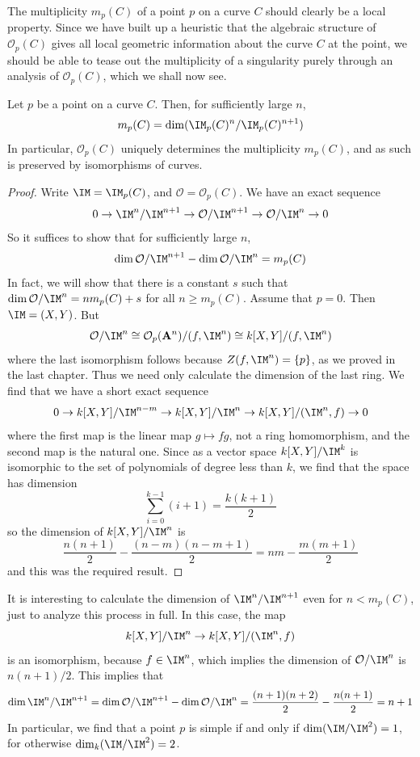 The multiplicity $m_p(C)$ of a point $p$ on a curve $C$ should clearly be a local property. Since we have built up a heuristic that the algebraic structure of $\mathcal{O}_p(C)$ gives all local geometric information about the curve $C$ at the point, we should be able to tease out the multiplicity of a singularity purely through an analysis of $\mathcal{O}_p(C)$, which we shall now see.

\begin{prop}
    Let $p$ be a point on a curve $C$. Then, for sufficiently large $n$,
    \[ m_p(C) = \dim(\IM_p(C)^n/\IM_p(C)^{n+1}) \]
    In particular, $\mathcal{O}_p(C)$ uniquely determines the multiplicity $m_p(C)$, and as such is preserved by isomorphisms of curves.
\end{prop}
\begin{proof}
    Write $\IM = \IM_p(C)$, and $\mathcal{O} = \mathcal{O}_p(C)$. We have an exact sequence
    \[ 0 \to \IM^n/\IM^{n+1} \to \mathcal{O}/\IM^{n+1} \to \mathcal{O}/\IM^n \to 0 \]
    So it suffices to show that for sufficiently large $n$,
    \[ \dim \mathcal{O}/\IM^{n+1} - \dim \mathcal{O}/\IM^n = m_p(C) \]
    In fact, we will show that there is a constant $s$ such that $\dim \mathcal{O}/\IM^n = nm_p(C) + s$ for all $n \geq m_p(C)$. Assume that $p = 0$. Then $\IM = (X,Y)$. But
    \[ \mathcal{O}/\IM^n \cong \mathcal{O}_p(\mathbf{A}^n)/(f,\IM^n) \cong k[X,Y]/(f,\IM^n) \]
    where the last isomorphism follows because $Z(f,\IM^n) = \{ p \}$, as we proved in the last chapter. Thus we need only calculate the dimension of the last ring. We find that we have a short exact sequence
    \[ 0 \to k[X,Y]/\IM^{n-m} \to k[X,Y]/\IM^n \to k[X,Y]/(\IM^n,f) \to 0 \]
    where the first map is the linear map $g \mapsto fg$, not a ring homomorphism, and the second map is the natural one. Since as a vector space $k[X,Y]/\IM^k$ is isomorphic to the set of polynomials of degree less than $k$, we find that the space has dimension
    \[ \sum_{i = 0}^{k-1} (i+1) = \frac{k(k+1)}{2} \]
    so the dimension of $k[X,Y]/\IM^n$ is
    \[ \frac{n(n+1)}{2} - \frac{(n-m)(n-m+1)}{2} = nm - \frac{m(m+1)}{2} \]
    and this was the required result.
\end{proof}

It is interesting to calculate the dimension of $\IM^n/\IM^{n+1}$ even for $n < m_p(C)$, just to analyze this process in full. In this case, the map
%
\[ k[X,Y]/\IM^n \to k[X,Y]/(\IM^n,f) \]
%
is an isomorphism, because $f \in \IM^n$, which implies the dimension of $\mathcal{O}/\IM^n$ is $n(n+1)/2$. This implies that
%
\[ \dim \IM^n/\IM^{n+1} = \dim \mathcal{O}/\IM^{n+1} - \dim \mathcal{O}/\IM^n = \frac{(n+1)(n+2)}{2} - \frac{n(n+1)}{2} = n + 1 \]
%
In particular, we find that a point $p$ is simple if and only if $\dim(\IM/\IM^2) = 1$, for otherwise $\dim_k(\IM/\IM^2) = 2$.

